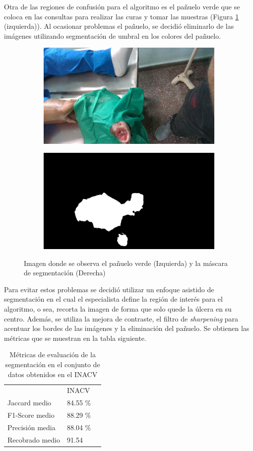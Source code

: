 Otra de las regiones de confusión para el algoritmo es el pañuelo verde que se coloca en las consultas para realizar las curas y tomar las muestras (Figura \ref{fig:tissueMask} (izquierda)). Al ocasionar problemas el pañuelo, se decidió eliminarlo de las imágenes utilizando segmentación de umbral en los colores del pañuelo. 

\begin{figure}
	\centering
	\begin{subfigure}
		\centering
		\includegraphics[width=.4\linewidth]{./Graphics/tissue.jpg}
	\end{subfigure}
	\begin{subfigure}
		\centering
		\includegraphics[width=.4\linewidth]{./Graphics/tissueMask.jpg}
	\end{subfigure}
	\caption{Imagen donde se observa el pañuelo verde (Izquierda) y la máscara de segmentación (Derecha)}
	\label{fig:tissueMask}
\end{figure}

Para evitar estos problemas se decidió utilizar un enfoque asistido de segmentación en el cual el especialista define la región de interés para el algoritmo, o sea, recorta la imagen de forma que solo quede la úlcera en su centro. Además, se utiliza la mejora de contraste, el filtro de \textit{sharpening} para acentuar los bordes de las imágenes y la eliminación del pañuelo. Se obtienen las métricas que se muestran en la tabla siguiente.

\begin{table}[ht]
	\centering
	\begin{tabular}{lll}
		\hhline{===}
		& INACV\\
		\hhline{===}
		Jaccard medio & 84.55 \% \\ \hline
		F1-Score medio & 88.29 \% \\ \hline
		Precisión media& 88.04 \% \\
		\hline
		Recobrado medio & 91.54 \\
		\hline
	\end{tabular}
	\caption{Métricas de evaluación de la segmentación en el conjunto de datos obtenidos en el INACV}
	\label{tab:metricSegm}
\end{table}

